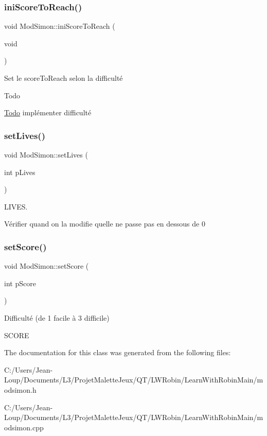 \subsubsection{\texorpdfstring{ini\+Score\+To\+Reach()}{iniScoreToReach()}}
{\footnotesize\ttfamily void Mod\+Simon\+::ini\+Score\+To\+Reach (\begin{DoxyParamCaption}\item[{void}]{ }\end{DoxyParamCaption})}



Set le score\+To\+Reach selon la difficulté 

\begin{DoxyRefDesc}{Todo}
\item[\hyperlink{todo__todo000019}{Todo}]implémenter difficulté \end{DoxyRefDesc}
\mbox{\label{class_mod_simon_a8aa773733ce3e7cca012cf60383210aa}} 
\subsubsection{\texorpdfstring{set\+Lives()}{setLives()}}
{\footnotesize\ttfamily void Mod\+Simon\+::set\+Lives (\begin{DoxyParamCaption}\item[{int}]{p\+Lives }\end{DoxyParamCaption})}



L\+I\+V\+ES. 

Vérifier quand on la modifie qu\textquotesingle{}elle ne passe pas en dessous de 0 \mbox{\label{class_mod_simon_a5f019f6797813a9d2bd11c1e1692e1dd}} 
\subsubsection{\texorpdfstring{set\+Score()}{setScore()}}
{\footnotesize\ttfamily void Mod\+Simon\+::set\+Score (\begin{DoxyParamCaption}\item[{int}]{p\+Score }\end{DoxyParamCaption})}



Difficulté (de 1 facile à 3 difficile) 

S\+C\+O\+RE 

The documentation for this class was generated from the following files\+:\begin{DoxyCompactItemize}
\item 
C\+:/\+Users/\+Jean-\/\+Loup/\+Documents/\+L3/\+Projet\+Malette\+Jeux/\+Q\+T/\+L\+W\+Robin/\+Learn\+With\+Robin\+Main/modsimon.\+h\item 
C\+:/\+Users/\+Jean-\/\+Loup/\+Documents/\+L3/\+Projet\+Malette\+Jeux/\+Q\+T/\+L\+W\+Robin/\+Learn\+With\+Robin\+Main/modsimon.\+cpp\end{DoxyCompactItemize}
